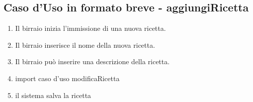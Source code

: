 \documentclass[a4paper,12pt]{report}
\begin{document}
		\subsection{Caso d'Uso in formato breve - aggiungiRicetta}
			\begin{enumerate}
    				\item Il birraio inizia l'immissione di una nuova ricetta.
    				\item Il birraio inserisce il nome della nuova ricetta.
				\item Il birraio può inserire una descrizione della ricetta.
    				\item import caso d'uso modificaRicetta
    				\item il sistema salva la ricetta		
			\end{enumerate}		
	
\end{document}
